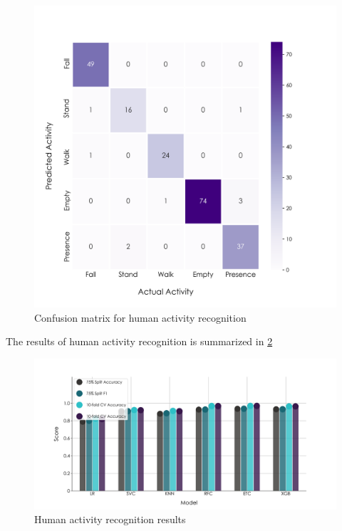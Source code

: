 \begin{figure}[H]
\centering
\includegraphics[width=1\textwidth]{./figure/chap 5/conf_multiclass.png}
\caption{Confusion matrix for human activity recognition}
\label{Fig 5.7}
\end{figure}

The results of human activity recognition is summarized in \ref{Fig 5.8}
\begin{figure}[H]
\centering
\includegraphics[width=1\textwidth]{./figure/chap 5/multiclass_model_scores.png}
\caption{Human activity recognition results}
\label{Fig 5.8}
\end{figure}

